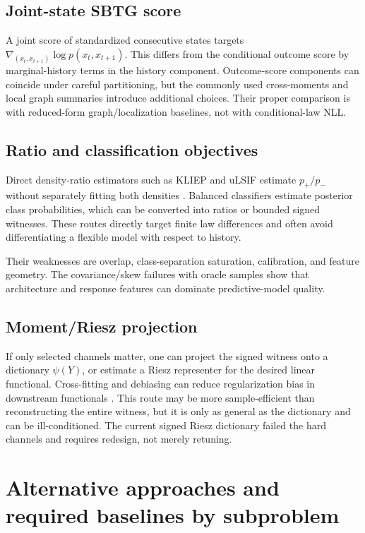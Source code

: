 \documentclass[10pt]{article}
\begin{document}
\subsection{Joint-state SBTG score}

A joint score of standardized consecutive states targets \(\nabla_{(x_t,x_{t+1})}\log p(x_t,x_{t+1})\). This differs from the conditional outcome score by marginal-history terms in the history component. Outcome-score components can coincide under careful partitioning, but the commonly used cross-moments and local graph summaries introduce additional choices. Their proper comparison is with reduced-form graph/localization baselines, not with conditional-law NLL.

\subsection{Ratio and classification objectives}

Direct density-ratio estimators such as KLIEP and uLSIF estimate \(p_+/p_-\) without separately fitting both densities \cite{kanamori2009}. Balanced classifiers estimate posterior class probabilities, which can be converted into ratios or bounded signed witnesses. These routes directly target finite law differences and often avoid differentiating a flexible model with respect to history.

Their weaknesses are overlap, class-separation saturation, calibration, and feature geometry. The covariance/skew failures with oracle samples show that architecture and response features can dominate predictive-model quality.

\subsection{Moment/Riesz projection}

If only selected channels matter, one can project the signed witness onto a dictionary \(\psi(Y)\), or estimate a Riesz representer for the desired linear functional. Cross-fitting and debiasing can reduce regularization bias in downstream functionals \cite{chernozhukov2022}. This route may be more sample-efficient than reconstructing the entire witness, but it is only as general as the dictionary and can be ill-conditioned. The current signed Riesz dictionary failed the hard channels and requires redesign, not merely retuning.

\section{Alternative approaches and required baselines by subproblem}
\end{document}

